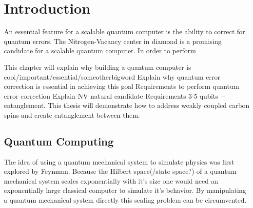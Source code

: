 \chapter{Introduction}



An essential feature for a scalable quantum computer is the ability to correct for quantum errors.
The Nitrogen-Vacancy center in diamond is a promising candidate for a scalable quantum computer.
In order to perform

This chapter will explain why building a quantum computer is cool/important/essential/someotherbigword
Explain why quantum error correction is essential in achieving this goal
Requirements to perform quantum error correction
Explain NV natural candidate
Requirements 3-5 qubits + entanglement.
This thesis will demonstrate how to address weakly coupled carbon spins and create entanglement between them.


\section{Quantum Computing}








The idea of using a quantum mechanical system to simulate physics was first explored by Feynman\cite{Feynman1982Simulating}. Because the Hilbert space(/state space?)  of a quantum mechanical system scales  exponentially with it's size one would need an exponentially large classical computer to simulate it's behavior. By manipulating a quantum mechanical system directly this scaling problem can be circumvented.


